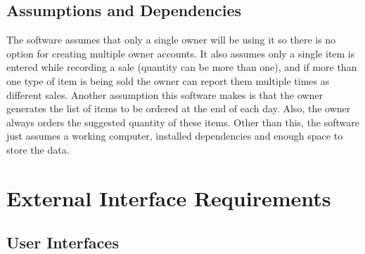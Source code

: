 \documentclass{scrreprt}
\begin{document}
\section{Assumptions and Dependencies}


The software assumes that only a single owner will be using it so there is no option for creating multiple owner accounts. It also assumes only a single item is entered while recording a sale (quantity can be more than one), and if more than one type of item is being sold the owner can report them multiple times as different sales. Another assumption this software makes is that the owner generates the list of items to be ordered at the end of each day. Also, the owner always orders the suggested quantity of these items. Other than this, the software just assumes a working computer, installed dependencies and enough space to store the data.

\chapter{External Interface Requirements}

\section{User Interfaces}
\end{document}
